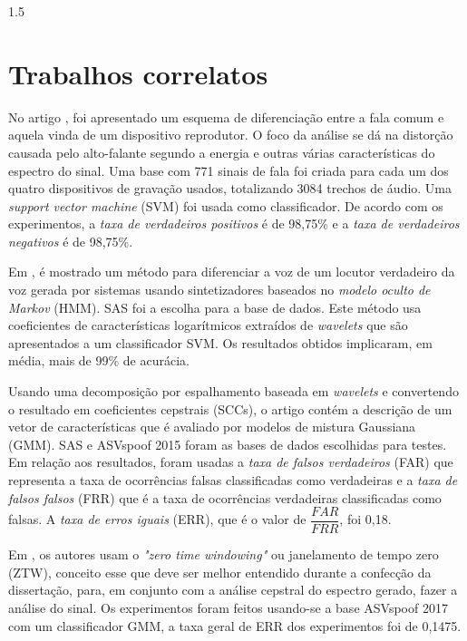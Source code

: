 \documentclass[a4paper,12pt,openright,oneside]{book}
\newenvironment{myenv}[1]
{\begin{spacing}{#1}}
	{\end{spacing}}
\begin{document}
\begin{myenv}{1.5}
\section{Trabalhos correlatos}
\par No artigo \cite{Ren2019}, foi apresentado um esquema de diferenciação entre a fala comum e aquela vinda de um dispositivo reprodutor. O foco da análise se dá na distorção causada pelo alto-falante segundo a energia e outras várias características do espectro do sinal. Uma base com 771 sinais de fala foi criada para cada um dos quatro dispositivos de gravação usados, totalizando 3084 trechos de áudio. Uma \textit{support vector machine} (SVM) foi usada como classificador. De  acordo com os experimentos, a \textit{taxa de verdadeiros positivos} é de 98,75\% e a \textit{taxa de verdadeiros negativos} é de 98,75\%.
\\
\par Em \cite{DiqunYan2019}, é mostrado um método para diferenciar a voz de um locutor verdadeiro da voz gerada por sistemas usando sintetizadores baseados no \textit{modelo oculto de Markov} (HMM). SAS\cite{SAS2019} foi a escolha para a base de dados. Este método usa coeficientes de características logarítmicos extraídos de \textit{wavelets} que são apresentados a um classificador SVM. Os resultados obtidos implicaram, em média, mais de 99\% de acurácia.
\\
\par Usando uma decomposição por espalhamento baseada em \textit{wavelets} e convertendo o resultado em coeficientes cepstrais (SCCs), o artigo \cite{7802552} contém a descrição de um vetor de características que é avaliado por modelos de mistura Gaussiana (GMM). SAS e ASVspoof 2015 \cite{ASVspoof2015} foram as bases de dados escolhidas para testes. Em relação aos resultados, foram usadas a \textit{taxa de falsos verdadeiros} (FAR) que representa a taxa de ocorrências falsas classificadas como verdadeiras e a \textit{taxa de falsos falsos} (FRR) que é a taxa de ocorrências verdadeiras classificadas como falsas. A \textit{taxa de erros iguais} (ERR), que é o valor de $\dfrac{FAR}{FRR}$, foi 0,18.
\\
\par Em \cite{alluri2019replay}, os autores usam o \textit{"zero time windowing"} ou janelamento de tempo zero (ZTW), conceito esse que deve ser melhor entendido durante a confecção da dissertação, para, em conjunto com a análise cepstral do espectro gerado, fazer a análise do sinal. Os experimentos foram feitos usando-se a base ASVspoof 2017\cite{ASVspoof2017} com um classificador GMM, a taxa geral de ERR dos experimentos foi de 0,1475.

\end{myenv}
\end{document}
